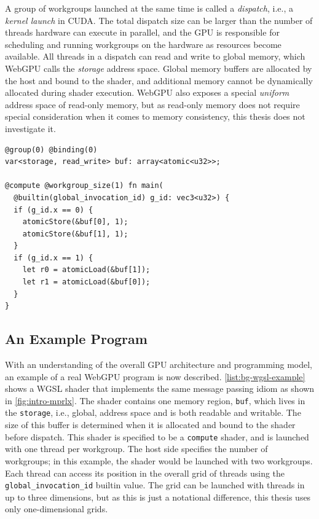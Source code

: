 A group of workgroups launched at the same time is called a \textit{dispatch}, i.e., a \textit{kernel launch} in CUDA. The total dispatch size can be larger than the number of threads hardware can execute in parallel, and the GPU is responsible for scheduling and running workgroups on the hardware as resources become available. All threads in a dispatch can read and write to global memory, which WebGPU calls the \textit{storage} address space. Global memory buffers are allocated by the host and bound to the shader, and additional memory cannot be dynamically allocated during shader execution. WebGPU also exposes a special \textit{uniform} address space of read-only memory, but as read-only memory does not require special consideration when it comes to memory consistency, this thesis does not investigate it.

\begin{lstlisting}[style=wgslfigure, float, caption={[WGSL shader implementing message passing]WGSL shader implementing the message passing program from \myfig\ref{fig:intro-mprlx}.}, label={list:bg-wgsl-example}]
@group(0) @binding(0)
var<storage, read_write> buf: array<atomic<u32>>;

@compute @workgroup_size(1) fn main(
  @builtin(global_invocation_id) g_id: vec3<u32>) {
  if (g_id.x == 0) {
    atomicStore(&buf[0], 1);
    atomicStore(&buf[1], 1);
  }
  if (g_id.x == 1) {
    let r0 = atomicLoad(&buf[1]);
    let r1 = atomicLoad(&buf[0]);
  }
}
\end{lstlisting}

\subsection{An Example Program}
\label{sec:bg-wgsl-example}

With an understanding of the overall GPU architecture and programming model, an example of a real WebGPU program is now described. \mylistinglong\ref{list:bg-wgsl-example} shows a WGSL shader that implements the same message passing idiom as shown in \myfig\ref{fig:intro-mprlx}. The shader contains one memory region, \texttt{buf}, which lives in the \texttt{storage}, i.e., global, address space and is both readable and writable. The size of this buffer is determined when it is allocated and bound to the shader before dispatch. This shader is specified to be a \texttt{compute} shader, and is launched with one thread per workgroup. The host side specifies the number of workgroups; in this example, the shader would be launched with two workgroups. Each thread can access its position in the overall grid of threads using the \texttt{global\_invocation\_id} builtin value. The grid can be launched with threads in up to three dimensions, but as this is just a notational difference, this thesis uses only one-dimensional grids.


